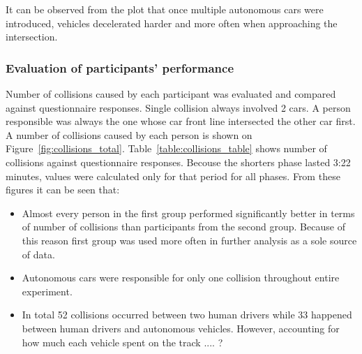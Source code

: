 \documentclass[11pt,english]{article}
\begin{document}
It can be observed from the plot that once multiple autonomous cars were introduced, vehicles decelerated harder and more often when approaching the intersection.







\subsubsection{Evaluation of participants' performance}

Number of collisions caused by each participant was evaluated and compared against questionnaire responses. Single collision always involved 2 cars. A person responsible was always the one whose car front line intersected the other car first. A number of collisions caused by each person is shown on Figure~\ref{fig:collisions_total}. Table~\ref{table:collisions_table} shows number of collisions against questionnaire responses. Becouse the shorters phase lasted 3:22 minutes, values were calculated only for that period for all phases. From these figures it can be seen that:
\begin{itemize}
  \item Almost every person in the first group performed significantly better in terms of number of collisions than participants from the second group. Because of this reason first group was used more often in further analysis as a sole source of data.
  \item Autonomous cars were responsible for only one collision throughout entire experiment. 
  \item  In total 52 collisions occurred between two human drivers while 33 happened between human drivers and autonomous vehicles. However, accounting for how much each vehicle spent on the track .... ?
\end{itemize}









\end{document}

